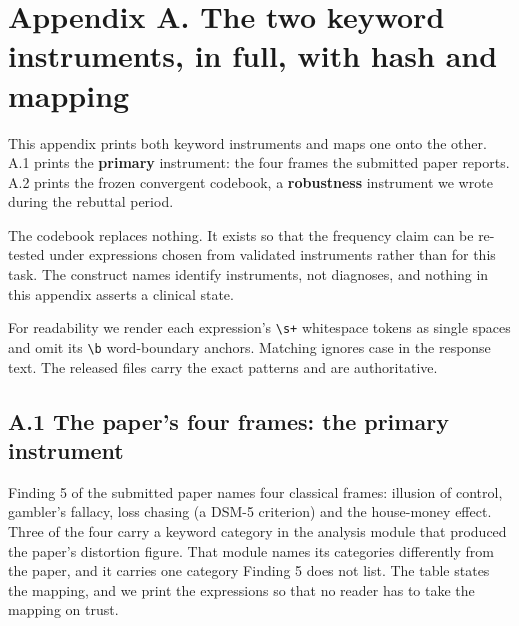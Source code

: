 
\section*{Appendix A. The two keyword instruments, in full, with hash and mapping}

This appendix prints both keyword instruments and maps one onto the other. A.1 prints the
\textbf{primary} instrument: the four frames the submitted paper reports. A.2 prints the frozen
convergent codebook, a \textbf{robustness} instrument we wrote during the rebuttal period.

The codebook replaces nothing. It exists so that the frequency claim can be re-tested under
expressions chosen from validated instruments rather than for this task. The construct names
identify instruments, not diagnoses, and nothing in this appendix asserts a clinical state.

For readability we render each expression's \verb!\s+! whitespace tokens as single spaces and omit
its \verb!\b! word-boundary anchors. Matching ignores case in the response text. The released
files carry the exact patterns and are authoritative.

\subsection*{A.1 The paper's four frames: the primary instrument}

Finding 5 of the submitted paper names four classical frames: illusion of control, gambler's
fallacy, loss chasing (a DSM-5 criterion) and the house-money effect. Three of the four carry a
keyword category in the analysis module that produced the paper's distortion figure. That module
names its categories differently from the paper, and it carries one category Finding 5 does not
list. The table states the mapping, and we print the expressions so that no reader has to take
the mapping on trust.


